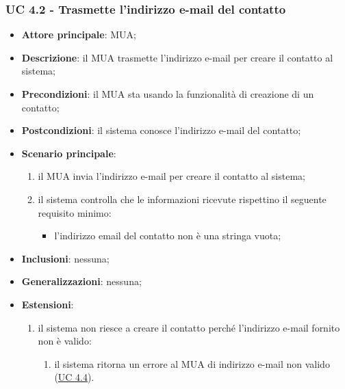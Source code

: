     \subsubsection{UC 4.2 - Trasmette l'indirizzo e-mail del contatto} \label{sec:UC4.2}
    \begin{itemize}
        \item \textbf{Attore principale}: MUA;
        \item \textbf{Descrizione}: il MUA trasmette l'indirizzo e-mail per creare il contatto al sistema;
        \item \textbf{Precondizioni}: il MUA sta usando la funzionalità di creazione di un contatto;
        \item \textbf{Postcondizioni}: il sistema conosce l'indirizzo e-mail del contatto;
        \item \textbf{Scenario principale}:
            \begin{enumerate}
                \item il MUA invia l'indirizzo e-mail per creare il contatto al sistema;
                \item il sistema controlla che le informazioni ricevute rispettino il seguente requisito minimo:
                    \begin{itemize}
                        \item l'indirizzo email del contatto non è una stringa vuota;
                    \end{itemize}
            \end{enumerate}
        \item \textbf{Inclusioni}: nessuna;
        \item \textbf{Generalizzazioni}: nessuna;
        \item \textbf{Estensioni}:
            \begin{enumerate}[label=\alph*.]
                \item il sistema non riesce a creare il contatto perché l'indirizzo e-mail fornito non è valido:
                \begin{enumerate}[label=\arabic*.]
                    \item il sistema ritorna un errore al MUA di indirizzo e-mail non valido (\hyperref[sec:UC4.4]{UC 4.4}).
                \end{enumerate}
            \end{enumerate}
    \end{itemize}




